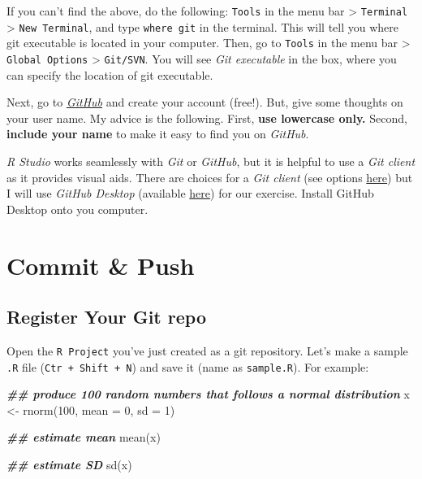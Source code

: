 \documentclass[
]{book}
\newenvironment{Shaded}{\begin{snugshade}}{\end{snugshade}}
\newcommand{\AttributeTok}[1]{\textcolor[rgb]{0.77,0.63,0.00}{#1}}
\newcommand{\DecValTok}[1]{\textcolor[rgb]{0.00,0.00,0.81}{#1}}
\newcommand{\DocumentationTok}[1]{\textcolor[rgb]{0.56,0.35,0.01}{\textbf{\textit{#1}}}}
\newcommand{\FunctionTok}[1]{\textcolor[rgb]{0.00,0.00,0.00}{#1}}
\newcommand{\NormalTok}[1]{#1}
\newcommand{\OtherTok}[1]{\textcolor[rgb]{0.56,0.35,0.01}{#1}}
\begin{document}
If you can't find the above, do the following: \texttt{Tools} in the menu bar \textgreater{} \texttt{Terminal} \textgreater{} \texttt{New\ Terminal}, and type \texttt{where\ git} in the terminal. This will tell you where git executable is located in your computer. Then, go to \texttt{Tools} in the menu bar \textgreater{} \texttt{Global\ Options} \textgreater{} \texttt{Git/SVN}. You will see \emph{Git executable} in the box, where you can specify the location of git executable.

Next, go to \href{https://github.com/}{\emph{GitHub}} and create your account (free!). But, give some thoughts on your user name. My advice is the following. First, \textbf{use lowercase only.} Second, \textbf{include your name} to make it easy to find you on \emph{GitHub}.

\emph{R Studio} works seamlessly with \emph{Git} or \emph{GitHub}, but it is helpful to use a \emph{Git client} as it provides visual aids. There are choices for a \emph{Git client} (see options \href{https://happygitwithr.com/git-client.html}{here}) but I will use \emph{GitHub Desktop} (available \href{https://desktop.github.com/}{here}) for our exercise. Install GitHub Desktop onto you computer.

\hypertarget{commit-push}{%
\section{Commit \& Push}\label{commit-push}}

\hypertarget{register-your-git-repo}{%
\subsection{Register Your Git repo}\label{register-your-git-repo}}

Open the \texttt{R\ Project} you've just created as a git repository. Let's make a sample \texttt{.R} file (\texttt{Ctr\ +\ Shift\ +\ N}) and save it (name as \texttt{sample.R}). For example:

\begin{Shaded}
\begin{Highlighting}[]
\DocumentationTok{\#\# produce 100 random numbers that follows a normal distribution}
\NormalTok{x }\OtherTok{\textless{}{-}} \FunctionTok{rnorm}\NormalTok{(}\DecValTok{100}\NormalTok{, }\AttributeTok{mean =} \DecValTok{0}\NormalTok{, }\AttributeTok{sd =} \DecValTok{1}\NormalTok{)}

\DocumentationTok{\#\# estimate mean}
\FunctionTok{mean}\NormalTok{(x)}

\DocumentationTok{\#\# estimate SD}
\FunctionTok{sd}\NormalTok{(x)}
\end{Highlighting}
\end{Shaded}
\end{document}
